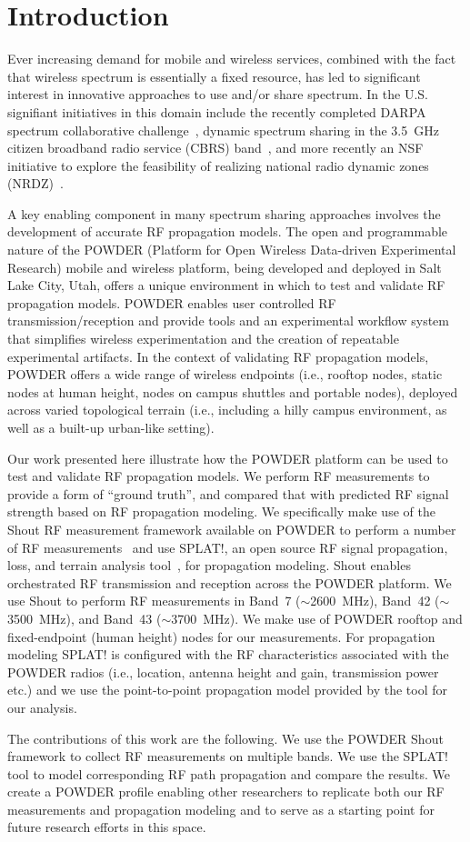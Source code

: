 
\section{Introduction}

Ever increasing demand for mobile and wireless services, combined with the
fact that wireless spectrum is essentially a fixed resource, has led to 
significant interest in innovative approaches to use and/or share spectrum.
In the U.S. signifiant initiatives in this domain include the recently
completed DARPA spectrum collaborative challenge~\cite{sc2}, dynamic spectrum
sharing in the 3.5~GHz citizen broadband radio service (CBRS) band~\cite{fcc_cbrs},
and more recently an NSF initiative to explore the feasibility of realizing national
radio dynamic zones (NRDZ)~\cite{nsf_nrdz}.

A key enabling component in many spectrum sharing approaches involves 
the development of accurate RF propagation models. 
The open and programmable nature of the POWDER (Platform for Open Wireless Data-driven Experimental Research) mobile and wireless platform, being developed and
deployed in Salt Lake City, Utah, offers a unique environment in which to test
and validate RF propagation models. 
POWDER enables user controlled RF transmission/reception and provide
tools and an experimental workflow system that simplifies wireless
experimentation and the creation of repeatable experimental artifacts.
In the context of validating RF propagation models, POWDER 
offers a wide range of wireless endpoints (i.e., rooftop nodes, static nodes at 
human height, nodes on campus shuttles and portable nodes),
deployed across varied topological terrain (i.e., including a hilly
campus environment, as well as a built-up urban-like setting).

Our work presented here illustrate how the POWDER platform can be used to test and validate
RF propagation models. We perform 
RF measurements to provide a form of “ground truth”, and compared that
with predicted RF signal strength based on RF propagation modeling.
We specifically make use of the Shout RF measurement framework available on POWDER to perform a number of RF measurements~\cite{b2} and use SPLAT!, an open source RF signal propagation, loss, and terrain analysis tool~\cite{b3}, for propagation modeling.
Shout enables orchestrated RF transmission and reception across the POWDER platform.
We use Shout to perform RF measurements in Band~7 ($\sim$2600~MHz), Band~42
($\sim$3500~MHz), and Band~43 ($\sim$3700~MHz). We make use of POWDER rooftop and
fixed-endpoint (human height) nodes for our measurements.
For propagation modeling SPLAT! is configured with the RF characteristics
associated with the POWDER radios (i.e., location, antenna height and gain, transmission
power etc.) and we use the point-to-point propagation model provided by the tool
for our analysis.

The contributions of this work are the following. We use the POWDER Shout framework to collect RF measurements on multiple bands. We use the SPLAT! tool to model corresponding RF path propagation and compare the results. We create a POWDER profile enabling other researchers to replicate both our RF measurements and propagation modeling and to serve as a starting point for future research efforts in this space.
